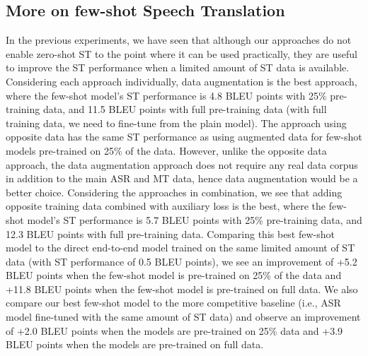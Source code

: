 \documentclass[conference]{IEEEtran}
\begin{document}
	\subsection{More on few-shot Speech Translation}
	In the previous experiments, we have seen that although our approaches do not enable zero-shot ST to the point where it can be used practically, they are useful to improve the ST performance when a limited amount of ST data is available. Considering each approach individually, data augmentation is the best approach, where the few-shot model's ST performance is 4.8 BLEU points with 25\% pre-training data, and 11.5 BLEU points with full pre-training data (with full training data, we need to fine-tune from the plain model). The approach using opposite data has the same ST performance as using augmented data for few-shot models pre-trained on 25\% of the data. However, unlike the opposite data approach, the data augmentation approach does not require any real data corpus in addition to the main ASR and MT data, hence data augmentation would be a better choice. Considering the approaches in combination, we see that adding opposite training data combined with auxiliary loss is the best, where the few-shot model's ST performance is 5.7 BLEU points with 25\% pre-training data, and 12.3 BLEU points with full pre-training data. Comparing this best few-shot model to the direct end-to-end model trained on the same limited amount of ST data (with ST performance of 0.5 BLEU points), we see an improvement of +5.2 BLEU points when the few-shot model is pre-trained on 25\% of the data and +11.8 BLEU points when the few-shot model is pre-trained on full data. We also compare our best few-shot model to the more competitive baseline (i.e., ASR model fine-tuned with the same amount of ST data) and observe an improvement of +2.0 BLEU points when the models are pre-trained on 25\% data and +3.9 BLEU points when the models are pre-trained on full data.
	
	
	
\end{document}
